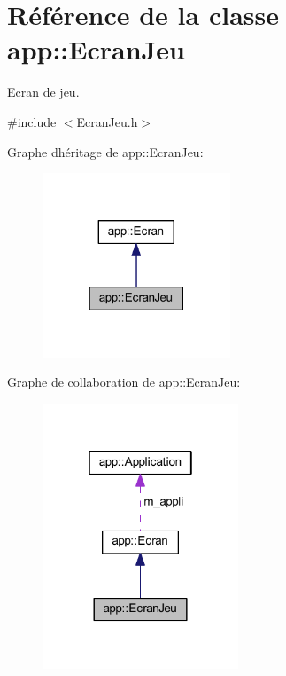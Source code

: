 \hypertarget{classapp_1_1_ecran_jeu}{}\section{Référence de la classe app\+:\+:Ecran\+Jeu}
\label{classapp_1_1_ecran_jeu}


\hyperlink{classapp_1_1_ecran}{Ecran} de jeu.  




{\ttfamily \#include $<$Ecran\+Jeu.\+h$>$}



Graphe d\textquotesingle{}héritage de app\+:\+:Ecran\+Jeu\+:\nopagebreak
\begin{figure}[H]
\begin{center}
\leavevmode
\includegraphics[width=159pt]{classapp_1_1_ecran_jeu__inherit__graph}
\end{center}
\end{figure}


Graphe de collaboration de app\+:\+:Ecran\+Jeu\+:\nopagebreak
\begin{figure}[H]
\begin{center}
\leavevmode
\includegraphics[width=166pt]{classapp_1_1_ecran_jeu__coll__graph}
\end{center}
\end{figure}
